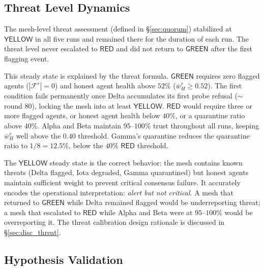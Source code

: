 \subsection{Threat Level Dynamics}
\label{sec:res_threat}

The mesh-level threat assessment (defined in \S\ref{sec:quorum}) stabilized at
$\mathsf{YELLOW}$ in all five runs and remained there for the duration of each run.
The threat level never escalated to $\mathsf{RED}$ and did not return to
$\mathsf{GREEN}$ after the first flagging event.

This steady state is explained by the threat formula.  $\mathsf{GREEN}$ requires zero
flagged agents ($|\mathcal{F}^r| = 0$) and honest agent health above $52\%$
($\bar{w}_H^r \geq 0.52$).  The first condition fails permanently once Delta accumulates
its first probe refusal ($\sim$ round 80), locking the mesh into at least
$\mathsf{YELLOW}$.  $\mathsf{RED}$ would require three or more flagged agents, or honest
agent health below $40\%$, or a quarantine ratio above $40\%$.  Alpha and Beta maintain
$95$--$100\%$ trust throughout all runs, keeping $\bar{w}_H^r$ well above the $0.40$
threshold.  Gamma's quarantine reduces the quarantine ratio to $1/8 = 12.5\%$, below
the $40\%$ $\mathsf{RED}$ threshold.

The $\mathsf{YELLOW}$ steady state is the correct behavior: the mesh contains known
threats (Delta flagged, Iota degraded, Gamma quarantined) but honest agents maintain
sufficient weight to prevent critical consensus failure.  It accurately encodes the
operational interpretation: \emph{alert but not critical}.  A mesh that returned to
$\mathsf{GREEN}$ while Delta remained flagged would be underreporting threat; a mesh
that escalated to $\mathsf{RED}$ while Alpha and Beta were at $95$--$100\%$ would be
overreporting it.  The threat calibration design rationale is discussed in
\S\ref{sec:disc_threat}.

\subsection{Hypothesis Validation}
\label{sec:res_hypotheses}

